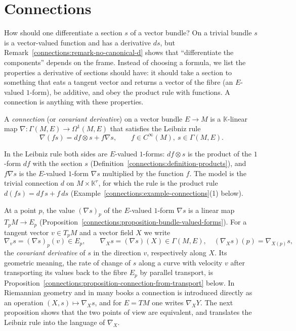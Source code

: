 \section{Connections}\label{connections:section-connections}

How should one differentiate a section $s$ of a vector bundle? On a trivial bundle $s$ is a vector-valued function and has a derivative $ds$, but Remark~\ref{connections:remark-no-canonical-d} shows
that ``differentiate the components'' depends on the frame. Instead of choosing a formula, we list the properties a derivative of sections should have: it should take a section to something that
eats a tangent vector and returns a vector of the fibre (an $E$-valued $1$-form), be additive, and obey the product rule with functions. A connection is anything with these properties.

\begin{definition}\label{connections:definition-connection}
A \emph{connection} (or \emph{covariant derivative}) on a vector bundle $E \to M$ is a $\mathbb{K}$-linear map $\nabla \colon \Gamma(M, E) \to \Omega^1(M, E)$ that satisfies the Leibniz rule
\[
\nabla(fs) = df \otimes s + f\nabla s, \qquad f \in C^\infty(M),\ s \in \Gamma(M, E).
\]
\end{definition}

In the Leibniz rule both sides are $E$-valued $1$-forms: $df \otimes s$ is the product of the $1$-form $df$ with the section $s$ (Definition~\ref{connections:definition-products}), and $f\nabla s$ is the
$E$-valued $1$-form $\nabla s$ multiplied by the function $f$. The model is the trivial connection $d$ on $M \times \mathbb{K}^r$, for which the rule is the product rule $d(fs) = df\,s + f\,ds$
(Example~\ref{connections:example-connections}(1) below).

At a point $p$, the value $(\nabla s)_p$ of the $E$-valued $1$-form $\nabla s$ is a linear map $T_pM \to E_p$ (Proposition~\ref{connections:proposition-bundle-valued-forms}). For a tangent vector $v \in T_pM$
and a vector field $X$ we write
\[
\nabla_vs = (\nabla s)_p(v) \in E_p, \qquad \nabla_Xs = (\nabla s)(X) \in \Gamma(M, E), \quad (\nabla_Xs)(p) = \nabla_{X(p)}s,
\]
the \emph{covariant derivative} of $s$ in the direction $v$, respectively along $X$. Its geometric meaning, the rate of change of $s$ along a curve with velocity $v$ after transporting
its values back to the fibre $E_p$ by parallel transport, is Proposition~\ref{connections:proposition-connection-from-transport} below. In Riemannian geometry and in many books a connection is introduced directly as an operation $(X, s) \mapsto \nabla_Xs$, and for
$E = TM$ one writes $\nabla_XY$. The next proposition shows that the two points of view are equivalent, and translates the Leibniz rule into the language of $\nabla_X$.

